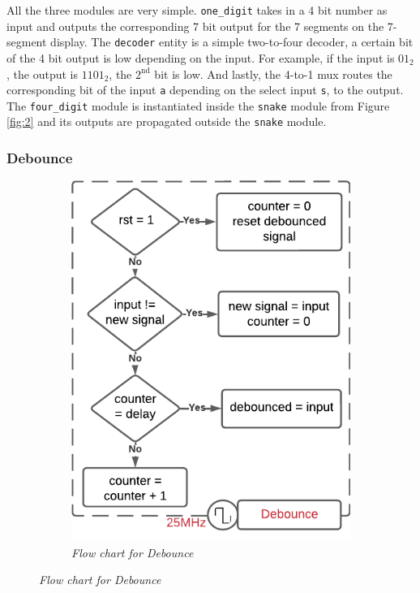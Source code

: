 \documentclass[aps, secnumarabic, balancelastpage, asmath, amssymb, nofootinbib, floatfix,]{revtex4-2}
\begin{document}
{All the three modules are very simple. \verb|one_digit| takes in a 4 bit number as input and outputs the corresponding 7 bit output for the 7 segments on the 7-segment display. The \verb|decoder| entity is a simple two-to-four decoder, a certain bit of the 4 bit output is low depending on the input. For example, if the input is $01_2$, the output is $1101_2$, the $2^{\text{nd}}$ bit is low. And lastly, the 4-to-1 mux routes the corresponding bit of the input \verb|a| depending on the select input \verb|s|, to the output. The \verb|four_digit| module is instantiated inside the \verb|snake| module from Figure \ref{fig:2} and its outputs are propagated outside the \verb|snake| module.

\vspace{-1em}
\subsubsection{\fontsize{10pt}{12pt}\selectfont \bf Debounce \label{sec:2.2.5}}

\begin{figure}[h]
\centering
\captionsetup{justification=centering}
\begin{subfigure}{0.5\textwidth}

  \includegraphics[scale = 0.6]{debounce_flow.pdf}
  \caption{\em Flow chart for Debounce}


\end{subfigure}
\end{figure}}
\end{document}
